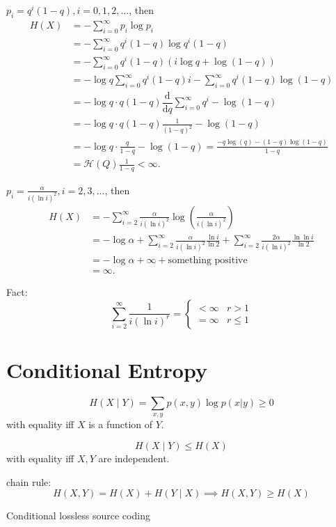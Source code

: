 \documentclass{report}
\newcommand{\df}{\mathrm{d}}
\newcommand{\dr}[2]{\dfrac{\df #1}{\df #2}}
\theoremstyle{definition}
\theoremstyle{remark}
\numberwithin{equation}{section}
\begin{document}
$p_i = q^i(1 - q), i = 0, 1, 2, \ldots$, then \begin{align*}
  H(X) & = -\sum_{i=0}^\infty p_i \log p_i \\
  & = -\sum_{i=0}^\infty q^i(1-q)\log q^i(1-q) \\
  & = -\sum_{i=0}^\infty q^i(1-q)\left(i\log q + \log(1-q)\right) \\
  & = -\log q\sum_{i=0}^\infty q^i(1-q)i - \sum_{i=0}^\infty q^i(1-q)\log(1-q) \\
  & = -\log q \cdot q(1 - q) \dr{}{q} \sum_{i=0}^\infty q^i - \log(1-q) \\
  & = - \log q \cdot q(1 - q) \frac{1}{(1-q)^2} - \log(1-q) \\
  & =  - \log q \cdot \frac{q}{1-q} - \log(1-q) = \frac{-q\log(q) - (1 - q)\log(1-q)}{1- q} \\
  & = \mathscr{H}(Q)\frac{1}{1 - q} < \infty.
\end{align*}

$p_i = \frac{\alpha}{i(\ln i)^2}, i = 2, 3, \ldots$, then \begin{align*}
  H(X) & = -\sum_{i=2}^\infty \frac{\alpha}{i(\ln i)^2} \log \left(\frac{\alpha}{i(\ln i)^2}\right) \\
  & = - \log \alpha + \sum_{i=2}^\infty \frac{\alpha}{i(\ln i)^2} \frac{\ln i}{\ln 2} + \sum_{i=2}^\infty \frac{2\alpha}{i(\ln i)^2} \frac{\ln \ln i}{\ln 2} \\
  & = - \log \alpha + \infty + \text{something positive} \\
  & = \infty.
\end{align*}

Fact: \[\sum_{i=2}^\infty \frac{1}{i(\ln i)^r} = \begin{cases}
   < \infty & r > 1 \\
   = \infty & r \leq 1
\end{cases}\]

\section{Conditional Entropy}

\[H(X \mid Y) = \sum_{x, y} p(x, y) \log p(x|y) \geq 0\] with equality iff $X$ is a function of $Y$.

\[H(X \mid Y) \leq H(X)\] with equality iff $X, Y$ are independent. 

chain rule: \[
  H(X, Y) = H(X) + H(Y \mid X) \implies H(X, Y) \geq H(X) 
\]

Conditional lossless source coding
\end{document}
